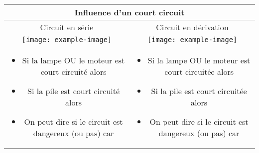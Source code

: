 \documentclass[10pt]{article}
\begin{document}
	\begin{tabular}{cc} \toprule
		\multicolumn{2}{c}{Influence d'un court circuit} \\ \midrule
		Circuit en série & Circuit en dérivation\\ \midrule
		\texttt{[image: example-image]} 
								& \texttt{[image: example-image]} \\
		\parbox[t]{0.47\textwidth}{
			\begin{itemize}
				\item Si la lampe OU le moteur est court circuité alors
			\end{itemize}
			\begin{itemize}
				\item Si la pile est court circuité alors 
			\end{itemize}
			\begin{itemize}
				\item On peut dire si le circuit est dangereux (ou pas) car
			\end{itemize}
			}
								& \parbox[t]{0.47\textwidth}{
									\begin{itemize}
										\item Si la lampe OU le moteur est court circuitée alors
									\end{itemize}
									\begin{itemize}
										\item Si la pile est court circuitée alors 
									\end{itemize}
									\begin{itemize}
										\item On peut dire si le circuit est dangereux (ou pas) car
									\end{itemize}
									} \\
	\end{tabular}
\end{document}
